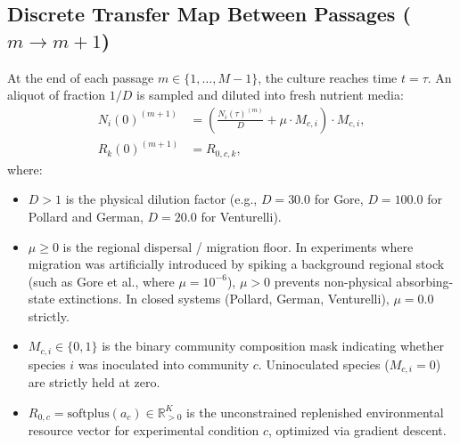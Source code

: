 \subsection{Discrete Transfer Map Between Passages \texorpdfstring{($m \to m+1$)}{(m -> m+1)}}
At the end of each passage $m \in \{1, \dots, M-1\}$, the culture reaches time $t = \tau$. An aliquot of fraction $1/D$ is sampled and diluted into fresh nutrient media:
\begin{align}
    \label{eq:transfer_biomass}
    N_i(0)^{(m+1)} &= \left( \frac{N_i(\tau)^{(m)}}{D} + \mu \cdot M_{c, i} \right) \cdot M_{c, i}, \\
    \label{eq:transfer_resource}
    R_k(0)^{(m+1)} &= R_{0, c, k},
\end{align}
where:
\begin{itemize}
    \item $D > 1$ is the physical dilution factor (e.g., $D=30.0$ for Gore, $D=100.0$ for Pollard and German, $D=20.0$ for Venturelli).
    \item $\mu \ge 0$ is the regional dispersal / migration floor. In experiments where migration was artificially introduced by spiking a background regional stock (such as Gore et al., where $\mu = 10^{-6}$), $\mu > 0$ prevents non-physical absorbing-state extinctions. In closed systems (Pollard, German, Venturelli), $\mu = 0.0$ strictly.
    \item $M_{c, i} \in \{0, 1\}$ is the binary community composition mask indicating whether species $i$ was inoculated into community $c$. Uninoculated species ($M_{c, i} = 0$) are strictly held at zero.
    \item $R_{0, c} = \text{softplus}(a_c) \in \mathbb{R}_{>0}^K$ is the unconstrained replenished environmental resource vector for experimental condition $c$, optimized via gradient descent.
\end{itemize}


